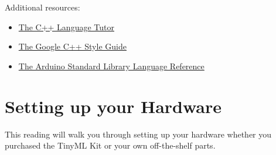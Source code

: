 \bigskip

Additional resources:

\begin{itemize}
  \item \href{https://www.cplusplus.com/doc/tutorial/}{The C++ Language Tutor}
  \item \href{https://google.github.io/styleguide/cppguide.html}{The Google C++ Style Guide}
  \item \href{https://www.arduino.cc/reference/en/}{The Arduino Standard Library Language Reference}
\end{itemize}


\section{Setting up your Hardware}

This reading will walk you through setting up your hardware whether you purchased the TinyML Kit or your own off-the-shelf parts.


